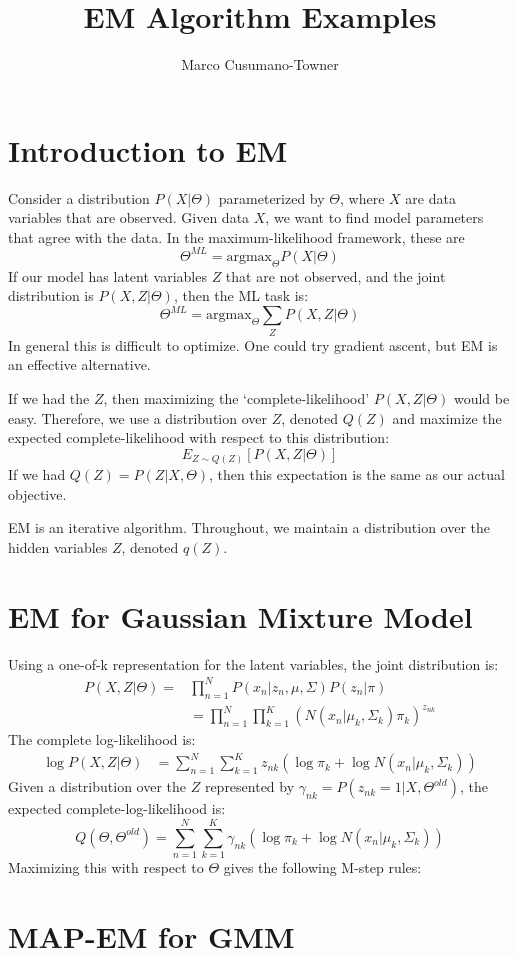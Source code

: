 \documentclass[11pt]{article}
\title{EM Algorithm Examples}
\author{Marco Cusumano-Towner}
\begin{document}
\section{Introduction to EM}
Consider a distribution $P(X | \Theta)$ parameterized by $\Theta$,
where $X$ are data variables that are observed. Given data $X$, we
want to find model parameters that agree with the data. In the
maximum-likelihood framework, these are
\[ \Theta^{ML} = \mbox{argmax}_{\Theta} P(X | \Theta) \]
If our model has latent variables $Z$ that are not observed, and the joint distribution is $P(X,Z|\Theta)$, then the ML task is:
\[ \Theta^{ML} = \mbox{argmax}_{\Theta} \sum_Z P(X,Z | \Theta) \]
In general this is difficult to optimize. One could try gradient
ascent, but EM is an effective alternative.

If we had the $Z$, then maximizing the `complete-likelihood'
$P(X,Z|\Theta)$ would be easy. Therefore, we use a distribution over
$Z$, denoted $Q(Z)$ and maximize the expected complete-likelihood with
respect to this distribution:
\[ E_{Z \sim Q(Z)} \left[ P(X,Z|\Theta) \right] \]
If we had $Q(Z) = P(Z | X, \Theta)$, then this expectation is the same as our actual objective.

EM is an iterative algorithm. Throughout, we maintain a distribution over the hidden variables $Z$, denoted $q(Z)$.

\section{EM for Gaussian Mixture Model}
Using a one-of-k representation for the latent variables, the joint distribution is:
\begin{align*}
  P(X,Z | \Theta) =& \prod_{n=1}^N P(x_n | z_n, \mu, \Sigma) P(z_n | \pi)\\
  &= \prod_{n=1}^N \prod_{k=1}^K \left( N(x_n | \mu_k, \Sigma_k) \pi_{k} \right)^{z_{nk}}
\end{align*}
The complete log-likelihood is:
\begin{align*}
  \log P(X,Z | \Theta) &= \sum_{n=1}^N \sum_{k=1}^K z_{nk} \left( \log \pi_{k} + \log N(x_n | \mu_k, \Sigma_k) \right)
\end{align*}
Given a distribution over the $Z$ represented by $\gamma_{nk} = P(z_{nk} = 1 | X, \Theta^{old})$, the expected complete-log-likelihood is:
\[ Q(\Theta,\Theta^{old}) = \sum_{n=1}^N \sum_{k=1}^K \gamma_{nk} \left( \log \pi_{k} + \log N(x_n | \mu_k, \Sigma_k) \right) \]
Maximizing this with respect to $\Theta$ gives the following M-step rules:

\section{MAP-EM for GMM}
\end{document}
